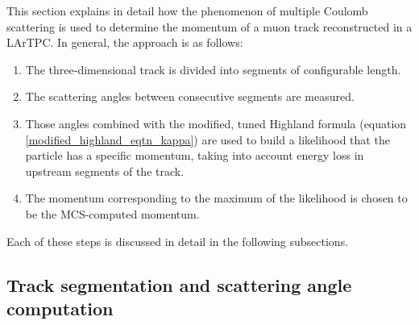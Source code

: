 \documentclass[a4paper,11pt]{article}
\begin{document}
This section explains in detail how the phenomenon of multiple Coulomb scattering is used to determine the momentum of a muon track reconstructed in a LArTPC. In general, the approach is as follows:
\begin{enumerate}
\item The three-dimensional track is divided into segments of configurable length.
\item The scattering angles between consecutive segments are measured.
\item Those angles combined with the modified, tuned Highland formula (equation \ref{modified_highland_eqtn_kappa}) are used to build a likelihood that the particle has a specific momentum, taking into account energy loss in upstream segments of the track.
\item The momentum corresponding to the maximum of the likelihood is chosen to be the MCS-computed momentum.
\end{enumerate}
Each of these steps is discussed in detail in the following subsections.\\














\subsection{Track segmentation and scattering angle computation}\label{track_segmentation_and_scattering_angle_computation_section}
\end{document}
